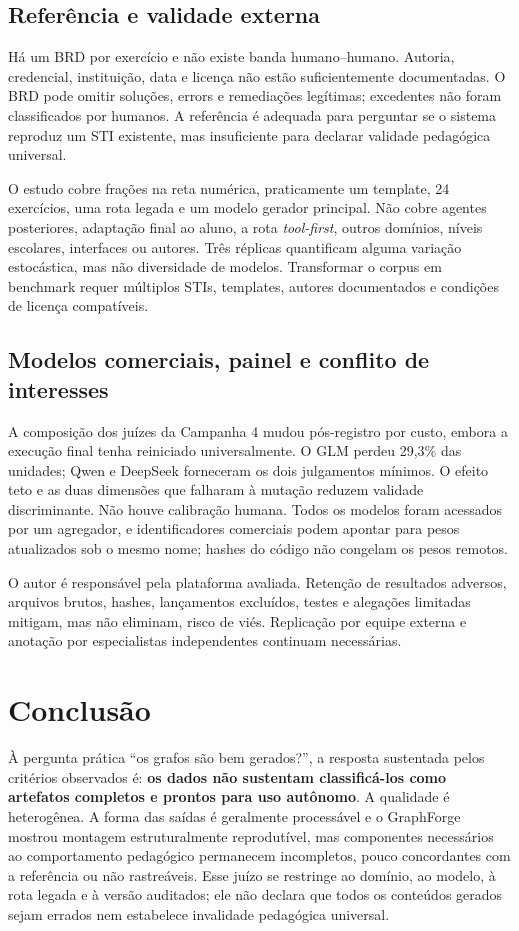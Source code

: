\documentclass[11pt,a4paper]{article}
\begin{document}
\subsection{Referência e validade externa}

Há um BRD por exercício e não existe banda humano--humano. Autoria, credencial, instituição, data e licença não estão suficientemente documentadas. O BRD pode omitir soluções, errors e remediações legítimas; excedentes não foram classificados por humanos. A referência é adequada para perguntar se o sistema reproduz um STI existente, mas insuficiente para declarar validade pedagógica universal.

O estudo cobre frações na reta numérica, praticamente um template, 24 exercícios, uma rota legada e um modelo gerador principal. Não cobre agentes posteriores, adaptação final ao aluno, a rota \emph{tool-first}, outros domínios, níveis escolares, interfaces ou autores. Três réplicas quantificam alguma variação estocástica, mas não diversidade de modelos. Transformar o corpus em benchmark requer múltiplos STIs, templates, autores documentados e condições de licença compatíveis.

\subsection{Modelos comerciais, painel e conflito de interesses}

A composição dos juízes da Campanha 4 mudou pós-registro por custo, embora a execução final tenha reiniciado universalmente. O GLM perdeu 29,3\% das unidades; Qwen e DeepSeek forneceram os dois julgamentos mínimos. O efeito teto e as duas dimensões que falharam à mutação reduzem validade discriminante. Não houve calibração humana. Todos os modelos foram acessados por um agregador, e identificadores comerciais podem apontar para pesos atualizados sob o mesmo nome; hashes do código não congelam os pesos remotos.

O autor é responsável pela plataforma avaliada. Retenção de resultados adversos, arquivos brutos, hashes, lançamentos excluídos, testes e alegações limitadas mitigam, mas não eliminam, risco de viés. Replicação por equipe externa e anotação por especialistas independentes continuam necessárias.

\section{Conclusão}

À pergunta prática ``os grafos são bem gerados?'', a resposta sustentada pelos critérios observados é: \textbf{os dados não sustentam classificá-los como artefatos completos e prontos para uso autônomo}. A qualidade é heterogênea. A forma das saídas é geralmente processável e o GraphForge mostrou montagem estruturalmente reprodutível, mas componentes necessários ao comportamento pedagógico permanecem incompletos, pouco concordantes com a referência ou não rastreáveis. Esse juízo se restringe ao domínio, ao modelo, à rota legada e à versão auditados; ele não declara que todos os conteúdos gerados sejam errados nem estabelece invalidade pedagógica universal.
\end{document}
